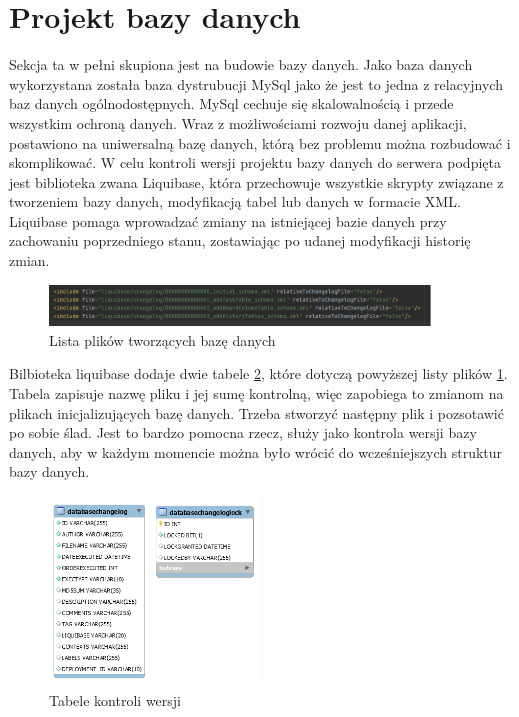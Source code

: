 \section{Projekt bazy danych}

Sekcja ta w pełni skupiona jest na budowie bazy danych. Jako baza danych wykorzystana została baza dystrubucji MySql jako że jest to jedna z relacyjnych baz danych ogólnodostępnych. MySql cechuje się skalowalnością i przede wszystkim ochroną danych. Wraz z możliwościami rozwoju danej aplikacji, postawiono na uniwersalną bazę danych, którą bez problemu można rozbudować i skomplikować.
W celu kontroli wersji projektu bazy danych do serwera podpięta jest biblioteka zwana Liquibase, która przechowuje wszystkie skrypty związane z tworzeniem bazy danych, modyfikacją tabel lub danych w formacie XML. Liquibase pomaga wprowadzać zmiany na istniejącej bazie danych przy zachowaniu poprzedniego stanu, zostawiając po udanej modyfikacji historię zmian. 
\begin{figure}[h]
	\centering
	\includegraphics[width=0.90\textwidth]{liqubase}		
	\caption{Lista plików tworzących bazę danych }
	\label{listaplikow}
\end{figure}
Bilbioteka liquibase dodaje dwie tabele \ref{liqutable}, które dotyczą powyższej listy plików \ref{listaplikow}. Tabela zapisuje nazwę pliku i jej sumę kontrolną, więc zapobiega to zmianom na plikach inicjalizujących bazę danych. Trzeba stworzyć następny plik i pozsotawić po sobie ślad. Jest to bardzo pomocna rzecz, służy jako kontrola wersji bazy danych, aby w każdym momencie można było wrócić do wcześniejszych struktur bazy danych.
\begin{figure}[h]
	\centering
	\includegraphics[width=0.50\textwidth]{liquibasetables}
	\caption{ Tabele kontroli wersji}
	\label{liqutable}
\end{figure}

